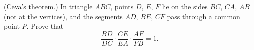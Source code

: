 (Ceva's theorem.) In triangle $ABC$, points $D$, $E$, $F$ lie on the sides $BC$, $CA$, $AB$ (not at the vertices), and the segments $AD$, $BE$, $CF$ pass through a common point $P$. Prove that
\[
\dfrac{BD}{DC}\cdot\dfrac{CE}{EA}\cdot\dfrac{AF}{FB}=1 .
\]
